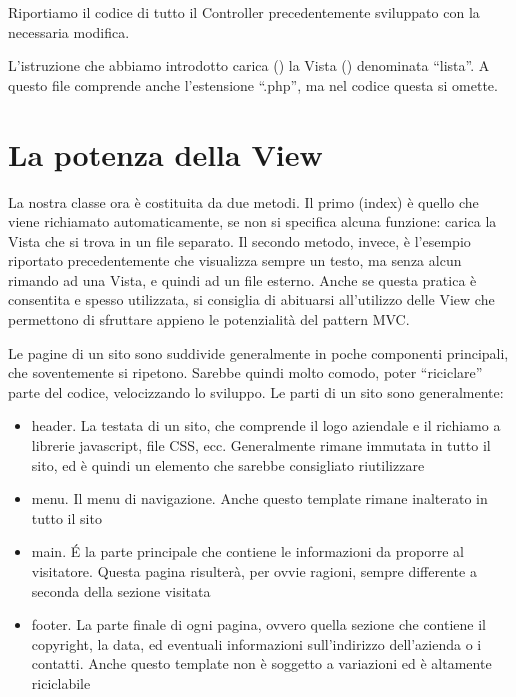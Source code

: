 
Riportiamo il codice di tutto il Controller  precedentemente sviluppato con la necessaria modifica.


L'istruzione che abbiamo introdotto carica () la Vista () denominata ``lista''. A questo file comprende anche l'estensione ``.php'', ma nel codice questa si omette.

\section*{La potenza della View}
La nostra classe  ora è costituita da due metodi. Il primo (index) è quello che viene richiamato automaticamente, se non si specifica alcuna funzione: carica la Vista  che si trova in un file separato. Il secondo metodo, invece, è l'esempio riportato precedentemente che visualizza sempre un testo, ma senza alcun rimando ad una Vista, e quindi ad un file esterno. Anche se questa pratica è consentita e spesso utilizzata, si consiglia di abituarsi all'utilizzo delle View che permettono di sfruttare appieno le potenzialità del pattern \ac{MVC}.

Le pagine di un sito sono suddivide generalmente in poche componenti principali, che soventemente si ripetono. Sarebbe quindi molto comodo, poter ``riciclare'' parte del codice, velocizzando lo sviluppo. Le parti di un sito sono generalmente:

\begin{itemize}
\item header. La testata di un sito, che comprende il logo aziendale e il richiamo a librerie javascript, file \ac{CSS}, ecc. Generalmente rimane immutata in tutto il sito, ed è quindi un elemento che sarebbe consigliato riutilizzare
\item menu. Il menu di navigazione. Anche questo template rimane inalterato in tutto il sito
\item main. \'E la parte principale che contiene le informazioni da proporre al visitatore. Questa pagina risulterà, per ovvie ragioni, sempre differente a seconda della sezione visitata
\item footer. La parte finale di ogni pagina, ovvero quella sezione che contiene il copyright, la data, ed eventuali informazioni sull'indirizzo dell'azienda o i contatti. Anche questo template non è soggetto a variazioni ed è altamente riciclabile
\end{itemize}

